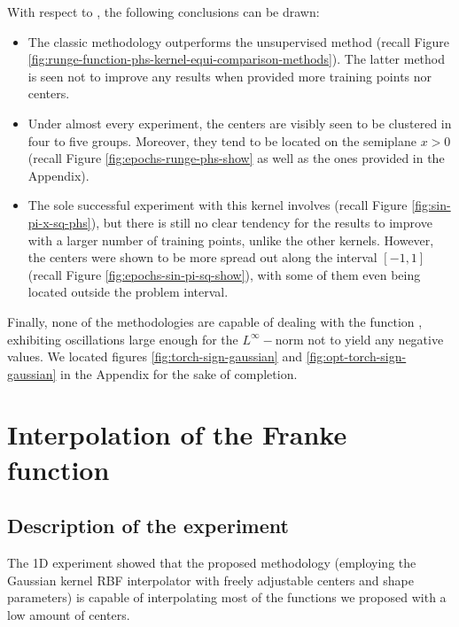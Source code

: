 \documentclass[12pt]{report} %
\newcommand{\tmverbatim}[1]{\text{{\ttfamily{#1}}}}
\begin{document}
With respect to \tmverbatim{phs\_kernel}, the following conclusions can be
drawn:
\begin{itemize}
  \item The classic methodology outperforms the unsupervised method (recall
  Figure \ref{fig:runge-function-phs-kernel-equi-comparison-methods}). The
  latter method is seen not to improve any results when provided more training
  points nor centers.
  
  \item Under almost every experiment, the centers are visibly seen to be
  clustered in four to five groups. Moreover, they tend to be located on the
  semiplane $x > 0$ (recall Figure \ref{fig:epochs-runge-phs-show} as well as
  the ones provided in the Appendix).
  
  \item The sole successful experiment with this kernel involves
  \tmverbatim{sin\_pi\_x\_sq} (recall Figure \ref{fig:sin-pi-x-sq-phs}), but
  there is still no clear tendency for the results to improve with a larger
  number of training points, unlike the other kernels. However, the centers
  were shown to be more spread out along the interval $[- 1, 1]$ (recall
  Figure \ref{fig:epochs-sin-pi-sq-show}), with some of them even being
  located outside the problem interval.
\end{itemize}
Finally, none of the methodologies are capable of dealing with the function
\tmverbatim{torch\_sign}, exhibiting oscillations large enough for the
$L^{\infty} -$norm not to yield any negative values. We located figures
\ref{fig:torch-sign-gaussian} and \ref{fig:opt-torch-sign-gaussian} in the
Appendix for the sake of completion.

\section{Interpolation of the Franke function}
\label{section:interpolation-of-franke}

\subsection*{Description of the experiment}

The 1D experiment showed that the proposed methodology (employing the Gaussian 
kernel RBF interpolator with freely adjustable centers and shape parameters) is 
capable of interpolating most of the functions we proposed with a low amount of 
centers.
\end{document}

